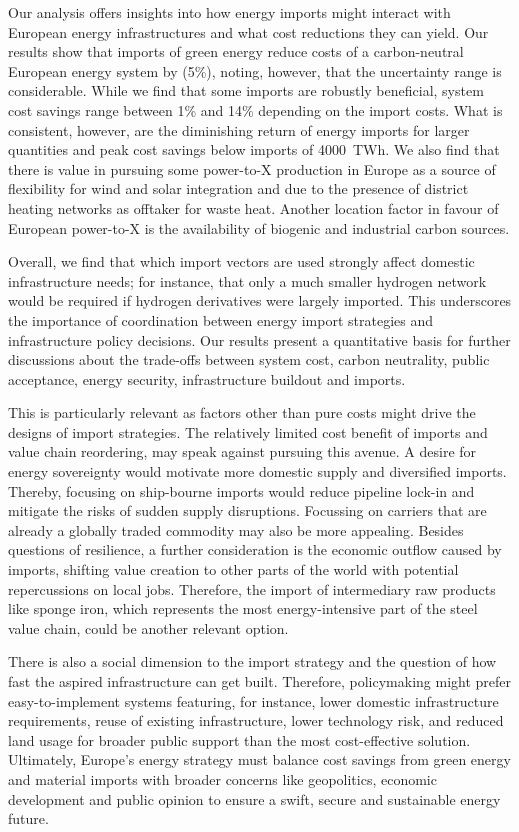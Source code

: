 Our analysis offers insights into how energy imports might interact with
European energy infrastructures and what cost reductions they can yield. Our
results show that imports of green energy reduce costs of a carbon-neutral
European energy system by  (5\%), noting, however, that the
uncertainty range is considerable. While we find that some imports are robustly
beneficial, system cost savings range between 1\% and 14\% depending on the
import costs. What is consistent, however, are the diminishing return of energy
imports for larger quantities and peak cost savings below imports of 4000~TWh.
We also find that there is value in pursuing some \mbox{power-to-X} production
in Europe as a source of flexibility for wind and solar integration and due to
the presence of district heating networks as offtaker for waste heat. Another
location factor in favour of European \mbox{power-to-X} is the availability of
biogenic and industrial carbon sources.

Overall, we find that which import vectors are used strongly affect domestic
infrastructure needs; for instance, that only a much smaller hydrogen network
would be required if hydrogen derivatives were largely imported. This
underscores the importance of coordination between energy import strategies and
infrastructure policy decisions. Our results present a quantitative basis for
further discussions about the trade-offs between system cost, carbon neutrality,
public acceptance, energy security, infrastructure buildout and imports.

This is particularly relevant as factors other than pure costs might drive the
designs of import strategies. The relatively limited cost benefit of imports and
value chain reordering, may speak against pursuing this avenue. A desire for
energy sovereignty would motivate more domestic supply and diversified imports.
Thereby, focusing on ship-bourne imports would reduce pipeline lock-in and
mitigate the risks of sudden supply disruptions. Focussing on carriers that are
already a globally traded commodity may also be more appealing. Besides
questions of resilience, a further consideration is the economic outflow caused
by imports, shifting value creation to other parts of the world with potential
repercussions on local jobs. Therefore, the import of intermediary raw products
like sponge iron, which represents the most energy-intensive part of the steel
value chain, could be another relevant option.

There is also a social dimension to the import strategy and the question of how
fast the aspired infrastructure can get built. Therefore, policymaking might
prefer easy-to-implement systems featuring, for instance, lower domestic
infrastructure requirements, reuse of existing infrastructure, lower technology
risk, and reduced land usage for broader public support than the most
cost-effective solution. Ultimately, Europe's energy strategy must balance cost
savings from green energy and material imports with broader concerns like
geopolitics, economic development and public opinion to ensure a swift, secure
and sustainable energy future.
